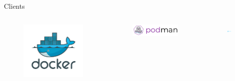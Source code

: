 \documentclass[11pt]{beamer}
\begin{document}
\begin{frame}{Clients}
\begin{columns}
	\begin{column}{0.33\textwidth}
		\begin{figure}
			\includegraphics[scale=0.10]{images/docker.png}
		\end{figure}
	\end{column}
	\begin{column}{0.33\textwidth}
		\begin{figure}
			\includegraphics[scale=0.15]{images/podman.png}
		\end{figure}
	\end{column}
	\begin{column}{0.33\textwidth}
		\begin{figure}		
			\includegraphics[scale=0.20]{images/portainer.png}
		\end{figure}	
	\end{column}
\end{columns}

\end{frame}
\end{document}
